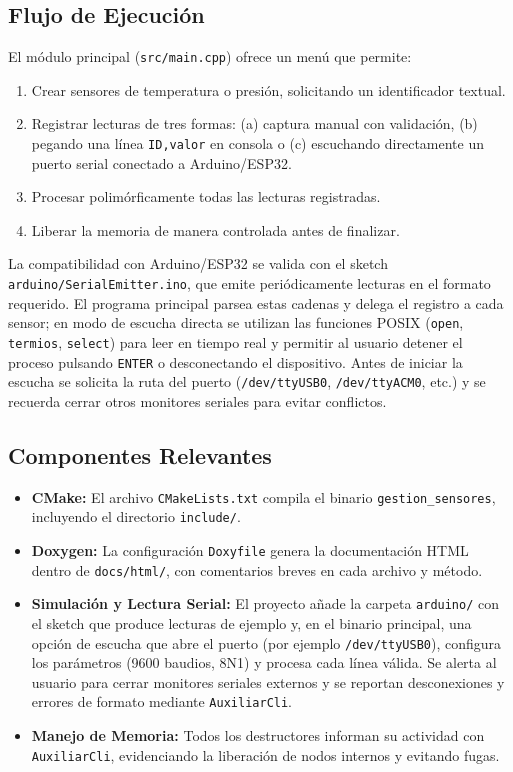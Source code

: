 \documentclass[11pt,a4paper]{article}
\begin{document}
\subsection{Flujo de Ejecución}

El módulo principal (\texttt{src/main.cpp}) ofrece un menú que permite:
\begin{enumerate}[leftmargin=1.5em]
    \item Crear sensores de temperatura o presión, solicitando un identificador textual.
    \item Registrar lecturas de tres formas: (a) captura manual con validación, (b) pegando una línea \texttt{ID,valor} en consola o (c) escuchando directamente un puerto serial conectado a Arduino/ESP32.
    \item Procesar polimórficamente todas las lecturas registradas.
    \item Liberar la memoria de manera controlada antes de finalizar.
\end{enumerate}

La compatibilidad con Arduino/ESP32 se valida con el sketch \texttt{arduino/SerialEmitter.ino}, que emite periódicamente lecturas en el formato requerido. El programa principal parsea estas cadenas y delega el registro a cada sensor; en modo de escucha directa se utilizan las funciones POSIX (\texttt{open}, \texttt{termios}, \texttt{select}) para leer en tiempo real y permitir al usuario detener el proceso pulsando \texttt{ENTER} o desconectando el dispositivo. Antes de iniciar la escucha se solicita la ruta del puerto (\texttt{/dev/ttyUSB0}, \texttt{/dev/ttyACM0}, etc.) y se recuerda cerrar otros monitores seriales para evitar conflictos.

\subsection{Componentes Relevantes}

\begin{itemize}[leftmargin=1.5em]
    \item \textbf{CMake:} El archivo \texttt{CMakeLists.txt} compila el binario \texttt{gestion\_sensores}, incluyendo el directorio \texttt{include/}.
    \item \textbf{Doxygen:} La configuración \texttt{Doxyfile} genera la documentación HTML dentro de \texttt{docs/html/}, con comentarios breves en cada archivo y método.
    \item \textbf{Simulación y Lectura Serial:} El proyecto añade la carpeta \texttt{arduino/} con el sketch que produce lecturas de ejemplo y, en el binario principal, una opción de escucha que abre el puerto (por ejemplo \texttt{/dev/ttyUSB0}), configura los parámetros (9600 baudios, 8N1) y procesa cada línea válida. Se alerta al usuario para cerrar monitores seriales externos y se reportan desconexiones y errores de formato mediante \texttt{AuxiliarCli}.
    \item \textbf{Manejo de Memoria:} Todos los destructores informan su actividad con \texttt{AuxiliarCli}, evidenciando la liberación de nodos internos y evitando fugas.
\end{itemize}
\end{document}

